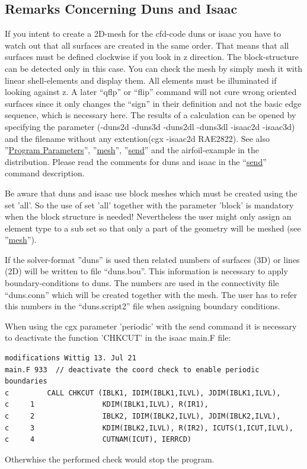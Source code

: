 \documentclass{article}
\providecommand{\htmlref}[2]{\hyperref[#2]{#1}}
\begin{document}
\begin{appendix}
\subsection{\label{Remarks Concerning Duns and Isaac}Remarks Concerning Duns and Isaac}
If you intent to create a 2D-mesh for the cfd-code duns or isaac you have to watch out that all surfaces are created in the same order. That means that all surfaces must be defined clockwise if you look in z direction. The block-structure can be detected only in this case. You can check the mesh by simply mesh it with linear shell-elements and display them. All elements must be illuminated if looking against z. A later ``qflp'' or ``flip'' command will not cure wrong oriented surfaces since it only changes the ``sign'' in their definition and not the basic edge sequence, which is necessary here. The results of a calculation can be opened by specifying the parameter (-duns2d -duns3d -duns2dl -duns3dl -isaac2d -isaac3d) and the filename without any extention(cgx -isaac2d RAE2822). See also ''\htmlref{Program Parameters}{Program Parameters}'', ''\htmlref{mesh}{mesh}'', ''\htmlref{send}{send}'' and the airfoil-example in the distribution. Please read the comments for duns and isaac in the ``\htmlref{send}{send}'' command description. 

Be aware that duns and isaac use block meshes which must be created using the set 'all'. So the use of set 'all' together with the parameter 'block' is mandatory when the block structure is needed! Nevertheless the user might only assign an element type to a sub set so that only a part of the geometry will be meshed (see ''\htmlref{mesh}{mesh}'').

If the solver-format ''duns'' is used then related numbers of surfaces (3D) or lines (2D) will be written to file ``duns.bou''. This information is necessary to apply boundary-conditions to duns. The numbers are used in the connectivity file ``duns.conn'' which will be created together with the mesh. The user has to refer this numbers in the ``duns.script2'' file when assigning boundary conditions.

When using the cgx parameter 'periodic' with the send command it is necessary to deactivate the function 'CHKCUT' in the isaac main.F file:
\begin{verbatim}
modifications Wittig 13. Jul 21
main.F 933  // deactivate the coord check to enable periodic boundaries
c         CALL CHKCUT (IBLK1, IDIM(IBLK1,ILVL), JDIM(IBLK1,ILVL), 
c     1                KDIM(IBLK1,ILVL), R(IR1),
c     2                IBLK2, IDIM(IBLK2,ILVL), JDIM(IBLK2,ILVL), 
c     3                KDIM(IBLK2,ILVL), R(IR2), ICUTS(1,ICUT,ILVL),
c     4                CUTNAM(ICUT), IERRCD)
\end{verbatim}
Otherwhise the performed check would stop the program.


\end{appendix}
\end{document}
